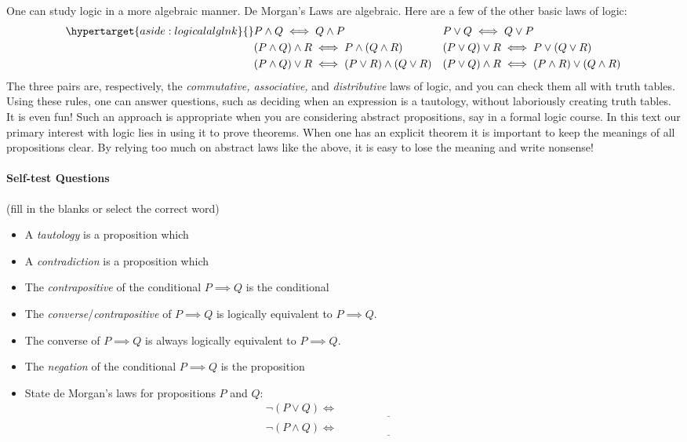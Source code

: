 \begin{aside}

One can study logic in a more algebraic manner. De Morgan's Laws are algebraic. Here are a few of the other basic laws of logic:
\begin{align*}\label{aside:logicalalg}\hypertarget{aside:logicalalglnk}{}
&P\wedge Q\iff Q\wedge P&&P\vee Q\iff Q\vee P\\
&(P\wedge Q)\wedge R\iff P\wedge(Q\wedge R)&&(P\vee Q)\vee R\iff P\vee(Q\vee R)\\
&(P\wedge Q)\vee R\iff (P\vee R)\wedge (Q\vee R)&&(P\vee Q)\wedge R\iff (P\wedge R)\vee (Q\wedge R)
\end{align*}
The three pairs are, respectively, the \emph{commutative, associative,} and \emph{distributive} laws of logic, and you can check them all with truth tables. Using these rules, one can answer questions, such as deciding when an expression is a tautology, without laboriously creating truth tables. It is even fun! Such an approach is appropriate when you are  considering abstract propositions, say in a formal logic course. In this text our primary interest with logic lies in using it to prove theorems. When one has an explicit theorem it is important to keep the meanings of all propositions clear. By relying too much on abstract laws like the above, it is easy to lose the meaning and write nonsense! 
\end{aside}



\paragraph{Self-test Questions} (fill in the blanks or select the correct word) 

\begin{itemize}
  \item A \emph{tautology} is a proposition which \underline{\phantom{is always true}\qquad\qquad}
  \item A \emph{contradiction} is a proposition which \underline{\phantom{is always false}\qquad\qquad}
  \item The \emph{contrapositive} of the conditional $P\implies Q$ is the conditional \underline{\phantom{$\not Q\implies\not P$}\qquad\qquad}
  \item The \emph{converse}/\emph{contrapositive} of $P\implies Q$ is logically equivalent to $P\implies Q$.
  \item The converse of $P\implies Q$ is always logically equivalent to $P\implies Q$.
  \item The \emph{negation} of the conditional $P\implies Q$ is the proposition \underline{\phantom{$\not Q\implies\not P$}\qquad\qquad}
  \item State de Morgan's laws for propositions $P$ and $Q$:
  \begin{gather*}
    \neg(P\vee Q)\iff\underline{\phantom{(\neg P)\wedge (\neg Q)}\qquad}\\
    \neg(P\wedge Q)\iff\underline{\phantom{(\neg P)\vee (\neg Q)\qquad}}
  \end{gather*}
\end{itemize}

